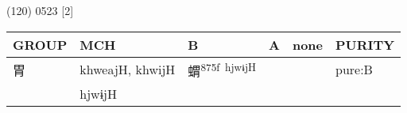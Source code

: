 \documentclass[14pt,a4paper]{scrartcl}
\begin{document}
(120) 0523 {[}2{]}

\begin{longtable}[c]{@{}llllll@{}}
\toprule
\begin{minipage}[b]{0.14\columnwidth}\raggedright\strut
GROUP
\strut\end{minipage} &
\begin{minipage}[b]{0.14\columnwidth}\raggedright\strut
MCH
\strut\end{minipage} &
\begin{minipage}[b]{0.14\columnwidth}\raggedright\strut
B
\strut\end{minipage} &
\begin{minipage}[b]{0.14\columnwidth}\raggedright\strut
A
\strut\end{minipage} &
\begin{minipage}[b]{0.14\columnwidth}\raggedright\strut
none
\strut\end{minipage} &
\begin{minipage}[b]{0.14\columnwidth}\raggedright\strut
PURITY
\strut\end{minipage}\tabularnewline
\midrule
\endhead
\begin{minipage}[t]{0.14\columnwidth}\raggedright\strut
胃
\strut\end{minipage} &
\begin{minipage}[t]{0.14\columnwidth}\raggedright\strut
khweajH, khwijH
\strut\end{minipage} &
\begin{minipage}[t]{0.14\columnwidth}\raggedright\strut
蝟\textsuperscript{875f~hjwɨjH}
\strut\end{minipage} &
\begin{minipage}[t]{0.14\columnwidth}\raggedright\strut
\strut\end{minipage} &
\begin{minipage}[t]{0.14\columnwidth}\raggedright\strut
\strut\end{minipage} &
\begin{minipage}[t]{0.14\columnwidth}\raggedright\strut
pure:B
\strut\end{minipage}\tabularnewline
\begin{minipage}[t]{0.14\columnwidth}\raggedright\strut
𦞅
\strut\end{minipage} &
\begin{minipage}[t]{0.14\columnwidth}\raggedright\strut
hjwɨjH
\strut\end{minipage} &
\begin{minipage}[t]{0.14\columnwidth}\raggedright\strut

\end{minipage}
\end{longtable}
\end{document}
